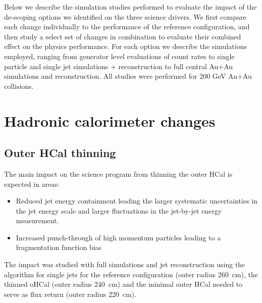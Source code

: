 
Below we describe the simulation studies performed to evaluate the impact of the de-scoping options we identified on the three 
science drivers. We  first compare each change individually to the performance of the reference configuration, and then study
a select set of changes in combination to evaluate their combined effect on the physics performance. For each option we 
describe the simulations employed, ranging from generator level evaluations of count rates to single particle and single jet
\geant simulations + reconstruction to full \hijing central Au+Au \geant simulations and reconstruction. All studies were 
performed for 200 GeV Au+Au collisions.
\section{Hadronic calorimeter changes}
\subsection{Outer HCal thinning}
The main impact on the science program from thinning the outer HCal is expected in areas:
\begin{itemize} 
\item Reduced jet energy containment leading the larger systematic uncertainties in the jet energy scale and larger fluctuations
in the jet-by-jet energy measurement.
\item Increased punch-through of high momentum particles leading to a fragmentation function bias
\end{itemize}
The impact was studied with full \geant simulations and jet reconstruction using the \antikt algorithm for single jets 
for the reference configuration (outer radius 260~cm), the thinned oHCal (outer radius 240~cm) and the minimal outer HCal needed 
to serve as flux return (outer radius 220~cm). 


